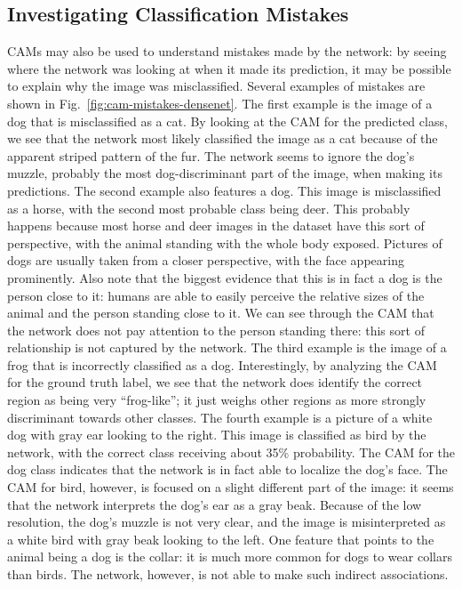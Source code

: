 \subsection{Investigating Classification Mistakes}
CAMs may also be used to understand mistakes made by the network: by seeing where the network was looking at when it made its prediction, it may be possible to explain why the image was misclassified. Several examples of mistakes are shown in Fig.~\ref{fig:cam-mistakes-densenet}. The first example is the image of a dog that is misclassified as a cat. By looking at the CAM for the predicted class, we see that the network most likely classified the image as a cat because of the apparent striped pattern of the fur. The network seems to ignore the dog's muzzle, probably the most dog-discriminant part of the image, when making its predictions. The second example also features a dog. This image is misclassified as a horse, with the second most probable class being deer. This probably happens because most horse and deer images in the dataset have this sort of perspective, with the animal standing with the whole body exposed. Pictures of dogs are usually taken from a closer perspective, with the face appearing prominently. Also note that the biggest evidence that this is in fact a dog is the person close to it: humans are able to easily perceive the relative sizes of the animal and the person standing close to it. We can see through the CAM that the network does not pay attention to the person standing there: this sort of relationship is not captured by the network. The third example is the image of a frog that is incorrectly classified as a dog. Interestingly, by analyzing the CAM for the ground truth label, we see that the network does identify the correct region as being very ``frog-like''; it just weighs other regions as more strongly discriminant towards other classes. The fourth example is a picture of a white dog with gray ear looking to the right. This image is classified as bird by the network, with the correct class receiving about 35\% probability. The CAM for the dog class indicates that the network is in fact able to localize the dog's face. The CAM for bird, however, is focused on a slight different part of the image: it seems that the network interprets the dog's ear as a gray beak. Because of the low resolution, the dog's muzzle is not very clear, and the image is misinterpreted as a white bird with gray beak looking to the left. One feature that  points to the animal being a dog is the collar: it is much more common for dogs to wear collars than birds. The network, however, is not able to make such indirect associations.


